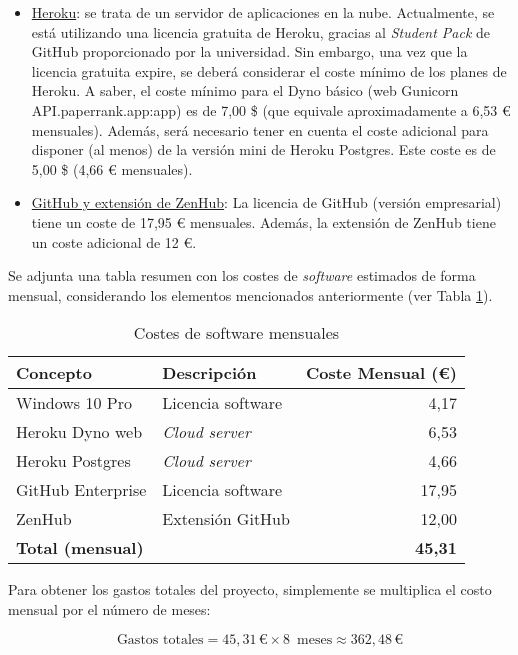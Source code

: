 \begin{enumerate}
    \begin{itemize}
        \item \underline{Heroku}: se trata de un servidor de aplicaciones en la nube. Actualmente, se está utilizando una licencia gratuita de Heroku, gracias al \textit{Student Pack} de GitHub proporcionado por la universidad. Sin embargo, una vez que la licencia gratuita expire, se deberá considerar el coste mínimo de los planes de Heroku. A saber, el coste mínimo para el Dyno básico (web Gunicorn API.paperrank.app:app) es de 7,00 \$ (que equivale aproximadamente a 6,53 € mensuales). Además, será necesario tener en cuenta el coste adicional para disponer (al menos) de la versión mini de Heroku Postgres. Este coste es de 5,00 \$ (4,66 € mensuales).
        \item \underline{GitHub y extensión de ZenHub}: La licencia de GitHub (versión empresarial) tiene un coste de 17,95 € mensuales. Además, la extensión de ZenHub tiene un coste adicional de 12 €.  
    \end{itemize}

    Se adjunta una tabla resumen con los costes de \textit{software} estimados de forma mensual, considerando los elementos mencionados anteriormente (ver Tabla \ref{tab:costes-software}). 

\begin{table}[h]
\centering
\begin{tabularx}{320}{@{}lXr@{}}
\toprule
\textbf{Concepto} & \textbf{Descripción} & \textbf{Coste Mensual (€)} \\
\midrule
Windows 10 Pro & Licencia software & 4,17 \\
Heroku Dyno web & \textit{Cloud server} & 6,53 \\
Heroku Postgres & \textit{Cloud server} & 4,66 \\
GitHub Enterprise & Licencia software & 17,95 \\
ZenHub & Extensión GitHub & 12,00  \\
\midrule
\textbf{Total (mensual)} & & \textbf{45,31} \\
\bottomrule
\end{tabularx}
\caption{Costes de software mensuales}
\label{tab:costes-software}
\end{table}

    Para obtener los gastos totales del proyecto, simplemente se multiplica el costo mensual por el número de meses:

    \[
    \text{{Gastos totales}} = 45,31 \, \text{{€}} \times 8 \,\text{{ meses}} \approx 362,48 \, \text{{€}}
    \]


\end{enumerate}
